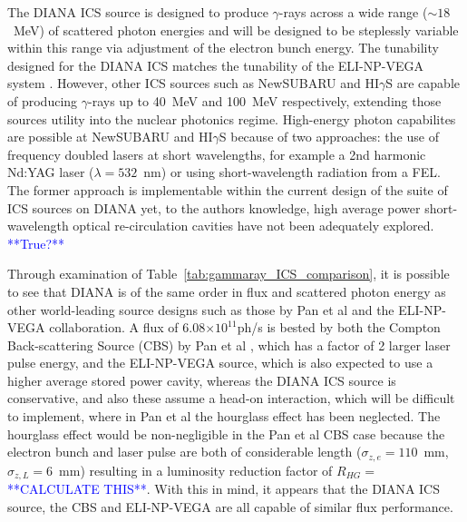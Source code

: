 \documentclass[../main.tex]{subfiles}
\begin{document}
The DIANA ICS source is designed to produce $\gamma$-rays across a wide  range ($\sim18$~\si{\mega\electronvolt}) of scattered photon energies and will be designed to be steplessly variable within this range via adjustment of the electron bunch energy. The tunability designed for the DIANA ICS matches the tunability of the ELI-NP-VEGA system \cite{tanaka2020current,elinp2019vega}. However, other ICS sources such as NewSUBARU and HI$\gamma$S are capable of producing $\gamma$-rays up to 40~\si{\mega\electronvolt} and 100~\si{\mega\electronvolt} respectively, extending those sources utility into the nuclear photonics regime. High-energy photon capabilites are possible at NewSUBARU and HI$\gamma$S because of two approaches: the use of frequency doubled lasers at short wavelengths, for example a 2nd harmonic Nd:YAG laser ($\lambda = 532$~\si{\nano\meter}) or using short-wavelength radiation from a FEL. The former approach is implementable within the current design of the suite of ICS sources on DIANA yet, to the authors knowledge, high average power short-wavelength optical re-circulation cavities have not been adequately explored. \textcolor{blue}{**True?**}  

Through examination of Table~\ref{tab:gammaray_ICS_comparison}, it is possible to see that DIANA is of the same order in flux and scattered photon energy as other world-leading source designs such as those by Pan et al and the ELI-NP-VEGA collaboration. A flux of 6.08$\times 10^{11}$ph/\si{\second} is bested by both the Compton Back-scattering Source (CBS) by Pan et al \cite{pan2019design}, which has a factor of 2 larger laser pulse energy, and the ELI-NP-VEGA source, which is also expected to use a higher average stored power cavity, whereas the DIANA ICS source is conservative, and also these assume a head-on interaction, which will be difficult to implement, where in Pan et al \cite{pan2019design} the hourglass effect has been neglected. The hourglass effect would be non-negligible in the Pan et al \cite{pan2019design} CBS case because the electron bunch and laser pulse are both of considerable length ($\sigma_{z,e} = 110$~\si{\milli\meter}, $\sigma_{z,L} = 6$~\si{\milli\meter}) resulting in a luminosity reduction factor of $R_{HG} = $ \textcolor{blue}{**CALCULATE THIS**}. With this in mind, it appears that the DIANA ICS source, the CBS and ELI-NP-VEGA are all capable of similar flux performance. 
\end{document}
